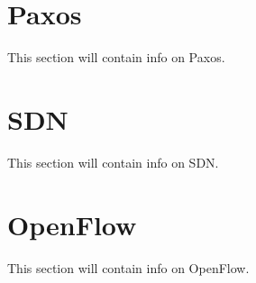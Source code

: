 \section{Paxos}
This section will contain info on Paxos.

\section{SDN}
This section will contain info on \ac{SDN}.

\section{OpenFlow}
This section will contain info on OpenFlow.

